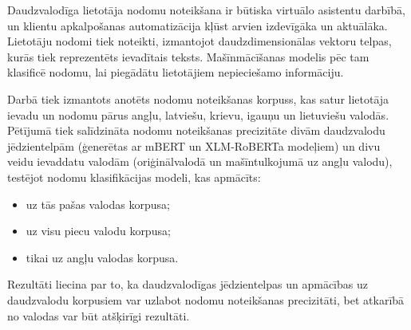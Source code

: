 Daudzvalodīga lietotāja nodomu noteikšana ir būtiska virtuālo asistentu darbībā, un klientu apkalpošanas automatizācija kļūst arvien izdevīgāka un aktuālāka. Lietotāju nodomi tiek noteikti, izmantojot daudzdimensionālas vektoru telpas, kurās tiek reprezentēts ievadītais teksts. Mašīnmācīšanas modelis pēc tam klasificē nodomu, lai piegādātu lietotājiem nepieciešamo informāciju.

Darbā tiek izmantots anotēts nodomu noteikšanas korpuss, kas satur lietotāja ievadu un nodomu pārus angļu, latviešu, krievu, igauņu un lietuviešu valodās. Pētījumā tiek salīdzināta nodomu noteikšanas precizitāte divām daudzvalodu jēdzientelpām (ģenerētas ar mBERT un XLM-RoBERTa modeļiem) un divu veidu ievaddatu valodām (oriģinālvalodā un mašīntulkojumā uz angļu valodu), testējot nodomu klasifikācijas modeli, kas apmācīts:
\begin{itemize}
    \item uz tās pašas valodas korpusa;
    \item uz visu piecu valodu korpusa;
    \item tikai uz angļu valodas korpusa.
\end{itemize}

Rezultāti liecina par to, ka daudzvalodīgas jēdzientelpas un apmācības uz daudzvalodu korpusiem var uzlabot nodomu noteikšanas precizitāti, bet atkarībā no valodas var būt atšķirīgi rezultāti.

